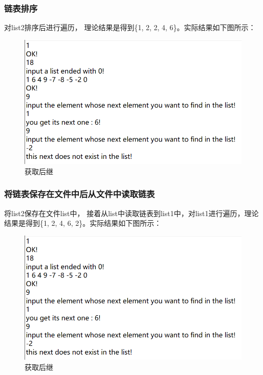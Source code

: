 \documentclass[supercite]{Experimental_Report}
\theoremstyle{definition}
\begin{document}
\subsubsection{链表排序}
对list2排序后进行遍历， 理论结果是得到\{1, 2, 2, 4, 6\}。实际结果如下图所示：
\begin{figure}[htbp]
	\centering
	\includegraphics[scale = 0.7]{images/8.png}
	\caption{获取后继}
\end{figure}

\subsubsection{将链表保存在文件中后从文件中读取链表}
将list2保存在文件list中， 接着从list中读取链表到list1中，对list1进行遍历，理论结果是得到\{1, 2, 4, 6, 2\}。实际结果如下图所示：
\begin{figure}[htbp]
	\centering
	\includegraphics[scale = 0.7]{images/8.png}
	\caption{获取后继}
\end{figure}
\end{document}
